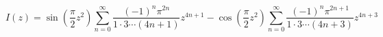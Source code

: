$$ I(z) = \sin( \frac{\pi}{2} z^2 ) \sum_{n=0}^\infty
    \frac{ (-1)^n \pi^{2n} }{1 \cdot 3 
    \cdots (4n + 1) } z^{4n + 1}
    -\cos( \frac{\pi}{2} z^2 ) \sum_{n=0}^\infty
    \frac{ (-1)^n \pi^{2n + 1} }{1 \cdot 3 
    \cdots (4n + 3) } z^{4n + 3} $$

